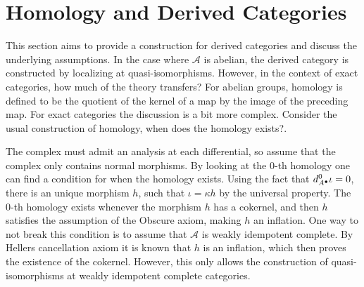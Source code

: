 \section{Homology and Derived Categories}

    This section aims to provide a construction for derived categories and discuss the underlying assumptions. In the case where $\mathcal{A}$ is abelian, the derived category is constructed by localizing at quasi-isomorphisms. However, in the context of exact categories, how much of the theory transfers? For abelian groups, homology is defined to be the quotient of the kernel of a map by the image of the preceding map. For exact categories the discussion is a bit more complex. Consider the usual construction of homology, when does the homology exists?.

    \begin{center}
    \end{center}

    The complex must admit an analysis at each differential, so assume that the complex only contains normal morphisms. By looking at the 0-th homology one can find a condition for when the homology exists. Using the fact that $d^0_{A^{\bullet}}\iota = 0$, there is an unique morphism $h$, such that $\iota = \kappa h$ by the universal property. The 0-th homology exists whenever the morphism $h$ has a cokernel, and then $h$ satisfies the assumption of the Obscure axiom, making $h$ an inflation. One way to not break this condition is to assume that $\mathcal{A}$ is weakly idempotent complete. By Hellers cancellation axiom it is known that $h$ is an inflation, which then proves the existence of the cokernel. However, this only allows the construction of quasi-isomorphisms at weakly idempotent complete categories.
    
